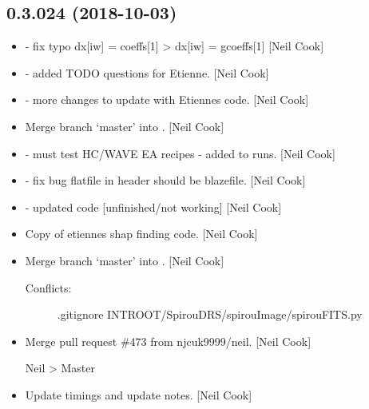 \documentclass[a4paper,10pt,english]{report}
\begin{document}
\subsection{0.3.024 (2018-10-03)}
\label{\detokenize{misc/changelog:id308}}\begin{itemize}
\item {} 
 - fix typo dx{[}iw{]} = coeffs{[}1{]} \textendash{}\textgreater{} dx{[}iw{]} =
gcoeffs{[}1{]} {[}Neil Cook{]}

\item {} 
 - added TODO questions for Etienne. {[}Neil Cook{]}

\item {} 
 - more changes to update with Etiennes
 code. {[}Neil Cook{]}

\item {} 
Merge branch ‘master’ into . {[}Neil Cook{]}

\item {} 
 - must test HC/WAVE EA recipes - added to runs. {[}Neil
Cook{]}

\item {} 
 - fix bug flatfile in header should be
blazefile. {[}Neil Cook{]}

\item {} 
 - updated code {[}unfinished/not working{]} {[}Neil
Cook{]}

\item {} 
Copy of etiennes shap finding code. {[}Neil Cook{]}

\item {} 
Merge branch ‘master’ into . {[}Neil Cook{]}
\begin{description}
\item[{Conflicts:}] \leavevmode
.gitignore
INTROOT/SpirouDRS/spirouImage/spirouFITS.py

\end{description}

\item {} 
Merge pull request \#473 from njcuk9999/neil. {[}Neil Cook{]}

Neil \textendash{}\textgreater{} Master

\item {} 
Update timings and update notes. {[}Neil Cook{]}


\end{itemize}
\end{document}
